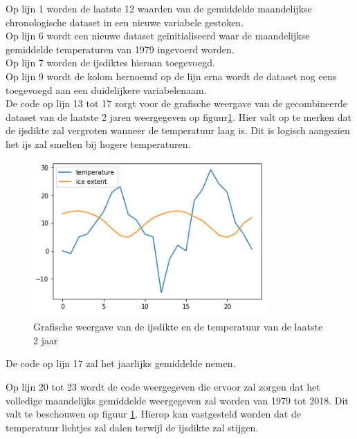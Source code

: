 Op lijn 1 worden de laatste 12 waarden van de gemiddelde maandelijkse chronologische dataset in een nieuwe variabele gestoken. \\
Op lijn 6 wordt een nieuwe dataset ge\"{i}nitialiseerd waar de maandelijkse gemiddelde temperaturen van 1979 ingevoerd worden.\\
Op lijn 7 worden de ijsdiktes hieraan toegevoegd. \\
Op lijn 9 wordt de kolom hernoemd op de lijn erna wordt de dataset nog eens toegevoegd aan een duidelijkere variabelenaam. \\

De code op lijn 13 tot 17 zorgt voor de grafische weergave van de gecombineerde dataset van de laatste 2 jaren weergegeven op figuur\ref{fig:combinedlastyears}. Hier valt op te merken dat de ijsdikte zal vergroten wanneer de temperatuur laag is. Dit is logisch aangezien het ijs zal smelten bij hogere temperaturen. \\

\begin{figure}
    \centering
    \caption{Grafische weergave van de ijsdikte en de temperatuur van de laatste 2 jaar}
    \label{fig:combinedlastyears}
    \includegraphics[width=0.7\linewidth]{combined_last_years.PNG}
\end{figure}

De code op lijn 17 zal het jaarlijks gemiddelde nemen.

Op lijn 20 tot 23 wordt de code weergegeven die ervoor zal zorgen dat het volledige maandelijks gemiddelde weergegeven zal worden van 1979 tot 2018. Dit valt te beschouwen op figuur \ref{fig:combinedlastyears}. Hierop kan vastgesteld worden dat de temperatuur lichtjes zal dalen terwijl de ijsdikte zal stijgen.

